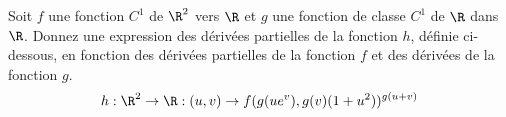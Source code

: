 
\begin{exercice}\label{exo0056}

Soit $f$ une fonction $C^1$ de $\R^2$ vers $\R$ et $g$ une
fonction de classe $C^1$ de $\R$ dans $\R$. Donnez une expression des
dérivées partielles de la fonction $h$, définie ci-dessous, en
fonction des dérivées partielles de la fonction $f$ et des dérivées
de la fonction $g$.
\[
h: \R^2 \rightarrow \R:(u,v) \rightarrow f(g(ue^v),g(v)(1+u^2))^{g(u+v)}
\]

\end{exercice}
